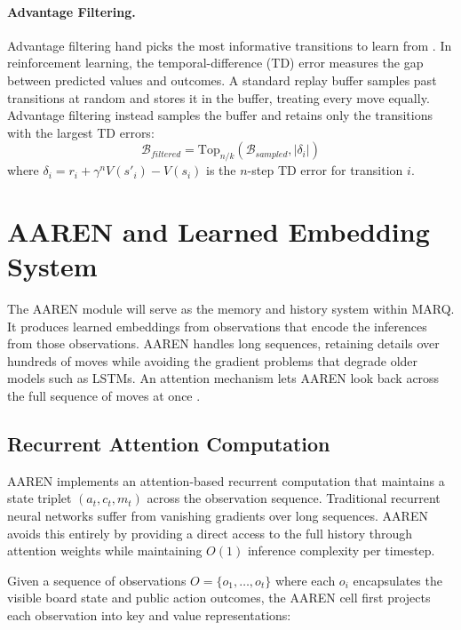 \paragraph{Advantage Filtering.}
Advantage filtering hand picks the most informative transitions to learn from \cite{RegularizationStrategyExploration}. In reinforcement learning, the temporal-difference (TD) error measures the gap between predicted values and outcomes. A standard replay buffer samples past transitions at random and stores it in the buffer, treating every move equally. Advantage filtering instead samples the buffer and retains only the transitions with the largest TD errors:
\begin{equation}
\mathcal{B}_{filtered} = \text{Top}_{n/k}\left(\mathcal{B}_{sampled}, |\delta_i|\right)
\end{equation}
where $\delta_i = r_i + \gamma^n V(s'_i) - V(s_i)$ is the $n$-step TD error for transition $i$.

\section{AAREN and Learned Embedding System}

The AAREN module \cite{Aaren} will serve as the memory and history system within MARQ. It produces learned embeddings from observations that encode the inferences from those observations. AAREN handles long sequences, retaining details over hundreds of moves while avoiding the gradient problems that degrade older models such as LSTMs. An attention mechanism lets AAREN look back across the full sequence of moves at once \cite{Aaren}.

\subsection{Recurrent Attention Computation}
AAREN implements an attention-based recurrent computation that maintains a state triplet $(a_t, c_t, m_t)$ across the observation sequence. Traditional recurrent neural networks suffer from vanishing gradients over long sequences. AAREN avoids this entirely by providing a direct access to the full history through attention weights while maintaining $O(1)$ inference complexity per timestep.

Given a sequence of observations $O = \{o_1, \ldots, o_t\}$ where each $o_i$ encapsulates the visible board state and public action outcomes, the AAREN cell first projects each observation into key and value representations:

